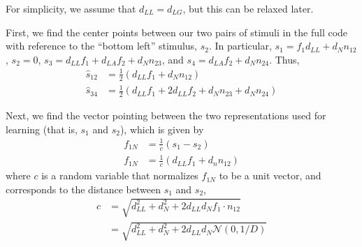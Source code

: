 \documentclass[letter,12pt]{article}
\newcommand{\dll}{d_{LL}}
\newcommand{\dlg}{d_{LG}}
\newcommand{\dla}{d_{LA}}
\newcommand{\dn}{d_{N}}
\newcommand{\dis}{\mathcal{N}(0, 1/D)}
\begin{document}
For simplicity, we assume that $\dll = \dlg$, but this can be relaxed later. 

First, we find the center points between our two pairs of stimuli in the full
code with reference to the ``bottom left'' stimulus, $s_{2}$. In particular,
$s_{1} = f_{1} \dll + \dn n_{12}$, $s_{2} = 0$,
$s_{3} = \dll f_{1} + \dla f_{2} + \dn n_{23}$,
and $s_{4} = \dla f_{2} + \dn n_{24}$. Thus, 
\begin{align}
  \hat{s}_{12} &= \frac{1}{2}\left(\dll f_{1} + \dn n_{12}\right) \\
  \hat{s}_{34} &= \frac{1}{2}\left(\dll f_{1} + 2\dll f_{2} + \dn n_{23}
  + \dn n_{24}\right)
\end{align}

Next, we find the vector pointing between the two representations used for
learning (that is, $s_{1}$ and $s_{2}$), which is given by
\begin{align}
  f_{1N} &= \frac{1}{c}\left(s_{1} - s_{2}\right) \\
  f_{1N} &= \frac{1}{c}\left(\dll f_{1} + d_{n}n_{12}\right)
\end{align}
where $c$ is a random variable that normalizes $f_{1N}$ to be a unit
vector, and corresponds to the distance between $s_{1}$ and $s_{2}$,
\begin{align}
  c &= \sqrt{\dll^{2} + \dn^{2} + 2 \dll \dn f_{1} \cdot n_{12}} \\
  &= \sqrt{\dll^{2} + \dn^{2} + 2 \dll \dn \dis} 
\end{align}
\end{document}
